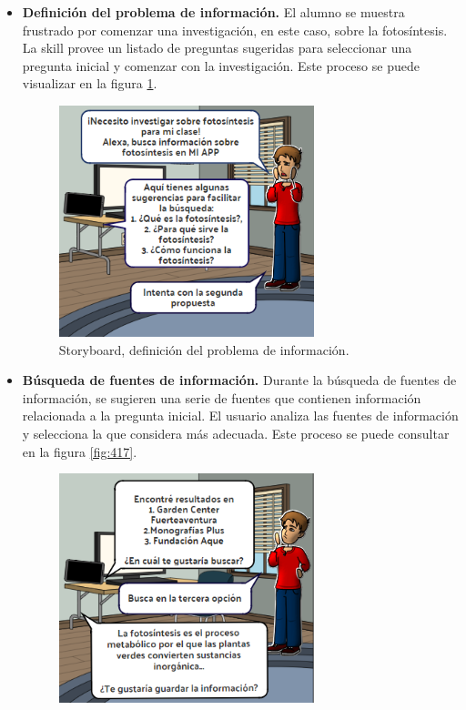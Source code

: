 \begin{itemize}
  \item \textbf{Definición del problema de información.} El alumno se muestra frustrado por comenzar una investigación, en este caso, sobre la fotosíntesis. La skill provee un listado de preguntas sugeridas para seleccionar una pregunta inicial y comenzar con la investigación. Este proceso se puede visualizar en la figura \ref{fig:416}.
  \begin{figure}
    \centering
    \includegraphics[width=0.70\textwidth]{Cap4/Figuras/01.png}
    \caption{Storyboard, definición del problema de información.}
    \label{fig:416}
  \end{figure}
  \item \textbf{Búsqueda de fuentes de información.} Durante la búsqueda de fuentes de información, se sugieren una serie de fuentes que contienen información relacionada a la pregunta inicial. El usuario analiza las fuentes de información y selecciona la que considera más adecuada. Este proceso se puede consultar en la figura \ref{fig:417}.
  \begin{figure}
    \centering
    \includegraphics[width=0.70\textwidth]{Cap4/Figuras/02.png}

\end{figure}
\end{itemize}
